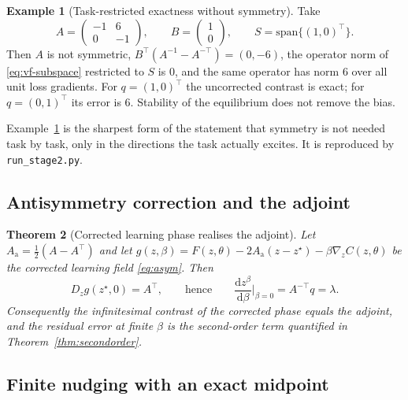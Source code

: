 \documentclass[11pt]{article}
\newtheorem{theorem}{Theorem}
\theoremstyle{definition}
\newtheorem{example}[theorem]{Example}
\theoremstyle{remark}
\newcommand{\grad}{\nabla}
\begin{document}
\begin{example}[Task-restricted exactness without symmetry]\label{ex:restricted}
Take
\begin{equation}
A = \begin{pmatrix} -1 & 6 \\ 0 & -1 \end{pmatrix}, \qquad
B = \begin{pmatrix} 1 \\ 0 \end{pmatrix}, \qquad
S = \mathrm{span}\{(1,0)^{\top}\}.
\end{equation}
Then $A$ is not symmetric, $B^{\top}(A^{-1}-A^{-\top}) = (0,-6)$, the operator norm of
\eqref{eq:vf-subspace} restricted to $S$ is $0$, and the same operator has norm $6$ over all unit
loss gradients. For $q = (1,0)^{\top}$ the uncorrected contrast is exact; for
$q = (0,1)^{\top}$ its error is $6$. Stability of the equilibrium does not remove the bias.
\end{example}

Example~\ref{ex:restricted} is the sharpest form of the statement that symmetry is not needed
task by task, only in the directions the task actually excites. It is reproduced by
\texttt{run\_stage2.py}.

\subsection{Antisymmetry correction and the adjoint}

\begin{theorem}[Corrected learning phase realises the adjoint]\label{thm:asym}
Let $A_{\mathrm a} = \tfrac12(A - A^{\top})$ and let $g(z,\beta) = F(z,\theta) - 2A_{\mathrm a}
(z - z^\star) - \beta\grad_z C(z,\theta)$ be the corrected learning field \eqref{eq:asym}. Then
\begin{equation}
D_z g(z^\star, 0) = A^{\top},
\qquad\text{hence}\qquad
\frac{\mathrm d z^\beta}{\mathrm d\beta}\Big|_{\beta=0} = A^{-\top} q = \lambda .
\label{eq:asym-jac}
\end{equation}
Consequently the infinitesimal contrast of the corrected phase equals the adjoint, and the
residual error at finite $\beta$ is the second-order term quantified in
Theorem~\ref{thm:secondorder}.
\end{theorem}

\subsection{Finite nudging with an exact midpoint}
\end{document}
